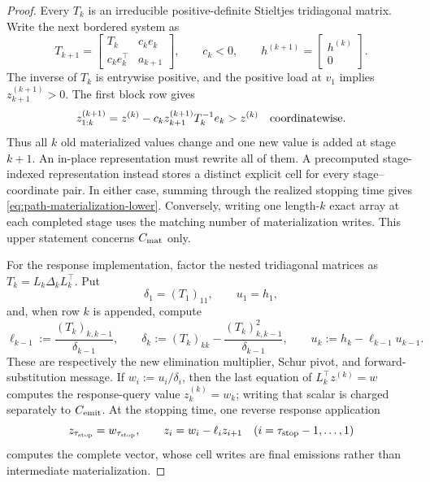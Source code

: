 \begin{proof}
Every $T_k$ is an irreducible positive-definite Stieltjes tridiagonal matrix.
Write the next bordered system as
\[
 T_{k+1}=
 \begin{bmatrix}T_k&c_ke_k\\c_ke_k^\top&a_{k+1}\end{bmatrix},
 \qquad c_k<0,
 \qquad h^{(k+1)}=\begin{bmatrix}h^{(k)}\\0\end{bmatrix}.
\]
The inverse of $T_k$ is entrywise positive, and the positive load at $v_1$
implies $z_{k+1}^{(k+1)}>0$.  The first block row gives
\begin{equation}
 z_{1:k}^{(k+1)}
 =z^{(k)}-c_k z_{k+1}^{(k+1)}T_k^{-1}e_k
 >z^{(k)}
 \quad\hbox{coordinatewise}.
 \label{eq:every-old-path-coordinate-changes}
\end{equation}
Thus all $k$ old materialized values change and one new value is added at
stage $k+1$.  An in-place representation must rewrite all of them.  A
precomputed stage-indexed representation instead stores a distinct explicit
cell for every stage--coordinate pair.  In either case, summing through the
realized stopping time gives \cref{eq:path-materialization-lower}.  Conversely,
writing one length-$k$ exact array at each completed stage uses the matching
number of materialization writes.  This upper statement concerns
$C_{\rm mat}$ only.

For the response implementation, factor the nested tridiagonal matrices as
$T_k=L_k\Delta_kL_k^\top$.  Put
\[
 \delta_1=(T_1)_{11},\qquad u_1=h_1,
\]
and, when row $k$ is appended, compute
\begin{equation}
 \ell_{k-1}:=\frac{(T_k)_{k,k-1}}{\delta_{k-1}},\qquad
 \delta_k:=(T_k)_{kk}
             -\frac{(T_k)_{k,k-1}^2}{\delta_{k-1}},\qquad
 u_k:=h_k-\ell_{k-1}u_{k-1}.
 \label{eq:append-only-ldl-messages}
\end{equation}
These are respectively the new elimination multiplier, Schur pivot, and
forward-substitution message.  If $w_i:=u_i/\delta_i$, then the last equation
of $L_k^\top z^{(k)}=w$ computes the response-query value
$z_k^{(k)}=w_k$; writing that scalar is charged separately to
$C_{\rm emit}$.  At the stopping time, one reverse response application
\begin{equation}
 z_{\tau_{\rm stop}}=w_{\tau_{\rm stop}},\qquad
 z_i=w_i-\ell_i z_{i+1}
 \quad(i=\tau_{\rm stop}-1,\ldots,1)
 \label{eq:single-final-path-materialization}
\end{equation}
computes the complete vector, whose cell writes are final emissions rather
than intermediate materialization.


\end{proof}
